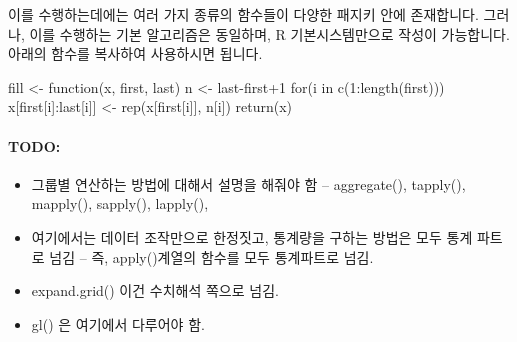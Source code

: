 \documentclass[tutorial.tex]{subfiles}
\begin{document}
이를 수행하는데에는 여러 가지 종류의 함수들이 다양한 패지키 안에 존재합니다.  
그러나, 이를 수행하는 기본 알고리즘은 동일하며, R 기본시스템만으로 작성이 가능합니다. 
아래의 함수를 복사하여 사용하시면 됩니다. 

\begin{Schunk}
	\begin{Soutput}
fill <- function(x, first, last){
	n <- last-first+1
	for(i in c(1:length(first))) x[first[i]:last[i]] <- rep(x[first[i]], n[i])
	return(x)
}
	\end{Soutput}
\end{Schunk}




\paragraph{TODO:}
\begin{itemize}
\item 그룹별 연산하는 방법에 대해서 설명을 해줘야 함 -- aggregate(), tapply(), mapply(), sapply(), lapply(), 
\item 여기에서는 데이터 조작만으로 한정짓고, 통계량을 구하는 방법은 모두 통계 파트로 넘김 -- 즉, apply()계열의 함수를 모두 통계파트로 넘김.
\item expand.grid() 이건 수치해석 쪽으로 넘김. 
\item gl() 은 여기에서 다루어야 함.
\end{itemize}

% 



\end{document}
